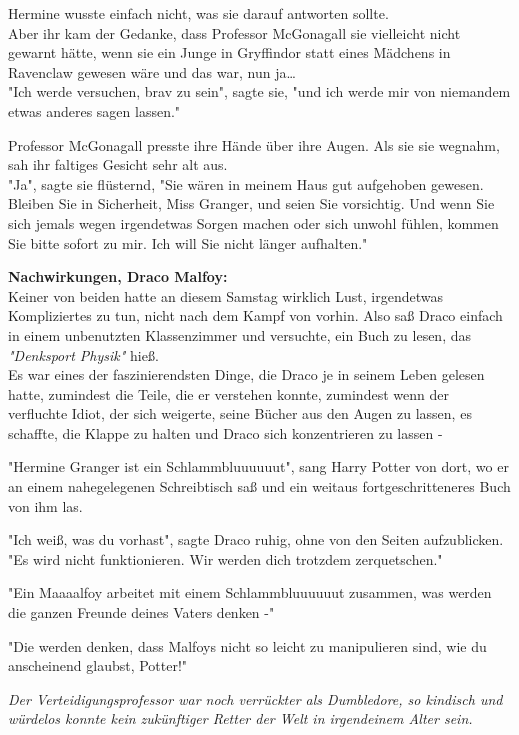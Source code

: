 {Hermine wusste einfach nicht, was sie darauf antworten sollte.\\ Aber ihr kam der Gedanke, dass Professor McGonagall sie vielleicht nicht gewarnt hätte, wenn sie ein Junge in Gryffindor statt eines Mädchens in Ravenclaw gewesen wäre und das war, nun ja…\\ "Ich werde versuchen, brav zu sein", sagte sie, "und ich werde mir von niemandem etwas anderes sagen lassen."

Professor McGonagall presste ihre Hände über ihre Augen. Als sie sie wegnahm, sah ihr faltiges Gesicht sehr alt aus.\\ "Ja", sagte sie flüsternd, "Sie wären in meinem Haus gut aufgehoben gewesen. Bleiben Sie in Sicherheit, Miss Granger, und seien Sie vorsichtig. Und wenn Sie sich jemals wegen irgendetwas Sorgen machen oder sich unwohl fühlen, kommen Sie bitte sofort zu mir. Ich will Sie nicht länger aufhalten."

\textbf{Nachwirkungen, Draco Malfoy:}\\ Keiner von beiden hatte an diesem Samstag wirklich Lust, irgendetwas Kompliziertes zu tun, nicht nach dem Kampf von vorhin. Also saß Draco einfach in einem unbenutzten Klassenzimmer und versuchte, ein Buch zu lesen, das \emph{"Denksport Physik"} hieß.\\ Es war eines der faszinierendsten Dinge, die Draco je in seinem Leben gelesen hatte, zumindest die Teile, die er verstehen konnte, zumindest wenn der verfluchte Idiot, der sich weigerte, seine Bücher aus den Augen zu lassen, es schaffte, die Klappe zu halten und Draco sich konzentrieren zu lassen -

"Hermine Granger ist ein Schlammbluuuuuut", sang Harry Potter von dort, wo er an einem nahegelegenen Schreibtisch saß und ein weitaus fortgeschritteneres Buch von ihm las.

"Ich weiß, was du vorhast", sagte Draco ruhig, ohne von den Seiten aufzublicken.\\ "Es wird nicht funktionieren. Wir werden dich trotzdem zerquetschen."

"Ein Maaaalfoy arbeitet mit einem Schlammbluuuuuut zusammen, was werden die ganzen Freunde deines Vaters denken -"

"Die werden denken, dass Malfoys nicht so leicht zu manipulieren sind, wie du anscheinend glaubst, Potter!"

\emph{Der Verteidigungsprofessor war noch verrückter als Dumbledore, so kindisch und würdelos konnte kein zukünftiger Retter der Welt in irgendeinem Alter sein.}

}
